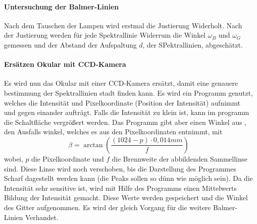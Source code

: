 \paragraph{Untersuchung der Balmer-Linien}
Nach dem Tauschen der Lampen wird erstmal die Justierung Widerholt. 
Nach der Justierung werden für jede Spektrallinie Widerrum die Winkel $\omega_B$ und $\omega_G$ gemessen und der Abstand der Aufspaltung $d$, der SPektrallinien, abgeschätzt.

\paragraph{Ersätzen Okular mit CCD-Kamera}
Es wird nun das Okular mit einer CCD-Kamera ersätzt, damit eine genauere bestimmung der Spektrallinien stadt finden kann. 
Es wird ein Programm genutzt, welches die Intensität und Pixelkoordinate (Position der Intensität) aufnimmt und gegen einander aufträgt. 
Falls die Intensität zu klein ist, kann im programm die Schaltfläche vergrößert werden.
Das Programm gibt aber einen Winkel aus , den Ausfalls winkel, welches es aus den Pixelkoordinaten entnimmt, mit 
\begin{equation}
    \beta = \arctan(\frac{(1024-p)\cdot0,014mm}{f})
\end{equation}
wobei, $p$ die Pixelkoordinate und $f$ die Brennweite der abbildenden Sammellinse sind.
Diese Linse wird noch verschoben, bis die Darstellung des Programmes Scharf dagestellt werden kann (die Peaks sollen so dünn wie möglich sein).
Da die Intensität sehr sensitive ist, wird mit Hilfe des Programms einen Mittelwerts Bildung der Intensität gemacht. 
Diese Werte werden gespeichert und die Winkel des Gitter aufgenommen. 
Es wird der gleich Vorgang für die weitere Balmer-Linien Verhandet.

